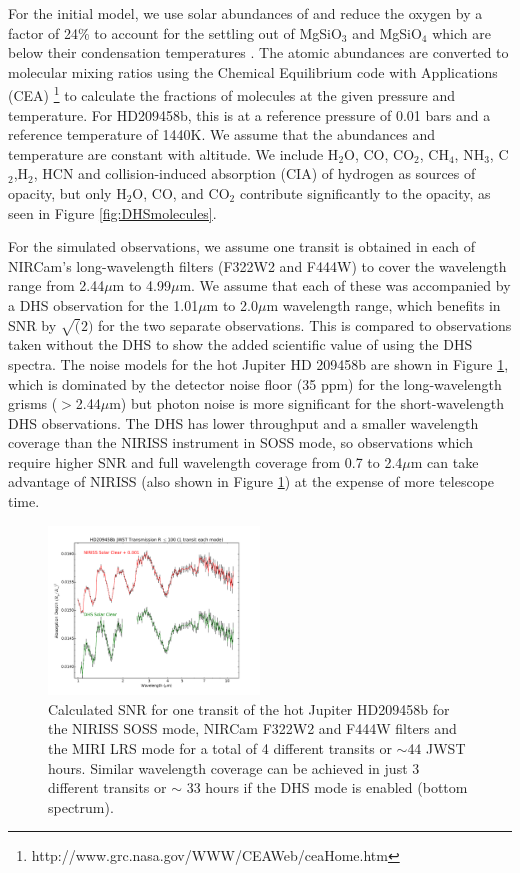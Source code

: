 \documentclass[iop]{emulateapj}
\begin{document}
For the initial model, we use solar abundances of \citet{asplund} and reduce the oxygen by a factor of 24\% to account for the settling out of MgSiO$_3$ and MgSiO$_4$ which are below their condensation temperatures \citep{sing2016continuum}.
The atomic abundances are converted to molecular mixing ratios using the Chemical Equilibrium code with Applications (CEA) \footnote{http://www.grc.nasa.gov/WWW/CEAWeb/ceaHome.htm}\citep{gordon1996cea} to calculate the fractions of molecules at the given pressure and temperature.
For HD209458b, this is at a reference pressure of 0.01 bars and a reference temperature of 1440K.
We assume that the abundances and temperature are constant with altitude.
We include H$_2$O, CO, CO$_2$, CH$_4$, NH$_3$, C$_2$,H$_2$, HCN and collision-induced absorption (CIA) of hydrogen as sources of opacity, but only H$_2$O, CO, and CO$_2$ contribute significantly to the opacity, as seen in Figure \ref{fig:DHSmolecules}.

For the simulated observations, we assume one transit is obtained in each of NIRCam's long-wavelength filters (F322W2 and F444W) to cover the wavelength range from 2.44$\mu$m to 4.99$\mu$m.
We assume that each of these was accompanied by a DHS observation for the 1.01$\mu$m to 2.0$\mu$m wavelength range, which benefits in SNR by $\sqrt(2)$ for the two separate observations.
This is compared to observations taken without the DHS to show the added scientific value of using the DHS spectra.
The noise models for the hot Jupiter HD 209458b are shown in Figure \ref{fig:DHSvsNIRISS209}, which is dominated by the detector noise floor (35 ppm) for the long-wavelength grisms ($>$2.44$\mu$m) but photon noise is more significant for the short-wavelength DHS observations.
The DHS has lower throughput and a smaller wavelength coverage than the NIRISS instrument in SOSS mode, so observations which require higher SNR and full wavelength coverage from 0.7 to 2.4$\mu$m can take advantage of NIRISS (also shown in Figure \ref{fig:DHSvsNIRISS209}) at the expense of more telescope time.

\begin{figure}
\centering
\includegraphics[width=0.5\textwidth]{HD209458b_solar_clear_1transit_DHS_vs_NIRISS_NIRCam_MIRILRS_R100.pdf}
\caption{Calculated SNR for one transit of the hot Jupiter HD209458b for the NIRISS SOSS mode, NIRCam F322W2 and F444W filters and the MIRI LRS mode for a total of 4 different transits or $\sim$44 JWST hours.
Similar wavelength coverage can be achieved in just 3 different transits or $\sim$ 33 hours if the DHS mode is enabled (bottom spectrum).}\label{fig:DHSvsNIRISS209}
\end{figure}
\end{document}
